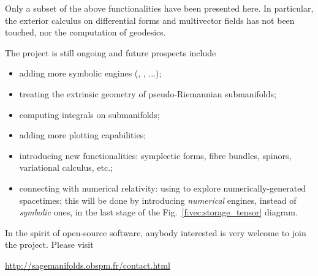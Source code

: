 Only a subset of the above functionalities have been presented here. In particular,
the exterior calculus on differential forms and multivector fields has not been
touched, nor the computation of geodesics.

\medskip

The  project is still ongoing and future prospects include
\begin{itemize}
\item adding more symbolic engines (, , ...);
\item treating the extrinsic geometry of pseudo-Riemannian submanifolds;
\item computing integrals on submanifolds;
\item adding more plotting capabilities;
\item introducing new functionalities: symplectic forms, fibre bundles,
spinors, variational calculus, etc.;
\item connecting with numerical relativity: using \Sage{} to explore
numerically-generated spacetimes; this will be done by introducing
\emph{numerical} engines, instead
of \emph{symbolic} ones, in the last stage of the Fig.~\ref{f:vec:storage_tensor}
diagram.
\end{itemize}
In the spirit of open-source software, anybody interested is very welcome
to join the project. Please visit
\begin{center}
\url{http://sagemanifolds.obspm.fr/contact.html}
\end{center}

